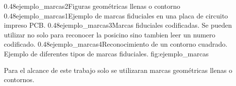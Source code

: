 \subfigtwotwo
            {0.48}{ejemplo_marcas2}{Figuras geométricas llenas o contorno} 
            {0.48}{ejemplo_marcas1}{Ejemplo de marcas fiduciales en una placa de circuito impreso PCB.}
            {0.48}{ejemplo_marcas3}{Marcas fiduciales codificadas. Se pueden utilizar no solo para reconocer la posicino sino tambien leer un numero codificado.}
            {0.48}{ejemplo_marcas4}{Reconocimiento de un contorno cuadrado.}
            {Ejemplo de diferentes tipos de marcas fiduciales.}
            {fig:ejemplo_marcas}

         Para el alcance de este trabajo solo se utilizaran marcas geométricas llenas o contornos.


